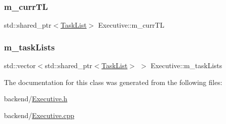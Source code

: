 \subsubsection{\texorpdfstring{m\+\_\+curr\+TL}{m\_currTL}}
{\footnotesize\ttfamily std\+::shared\+\_\+ptr$<$\mbox{\hyperlink{class_task_list}{Task\+List}}$>$ Executive\+::m\+\_\+curr\+TL}

\mbox{\label{class_executive_abaad195f97ce0a4b4be35064f905fc30}} 
\subsubsection{\texorpdfstring{m\+\_\+task\+Lists}{m\_taskLists}}
{\footnotesize\ttfamily std\+::vector$<$std\+::shared\+\_\+ptr$<$\mbox{\hyperlink{class_task_list}{Task\+List}}$>$ $>$ Executive\+::m\+\_\+task\+Lists}



The documentation for this class was generated from the following files\+:\begin{DoxyCompactItemize}
\item 
backend/\mbox{\hyperlink{_executive_8h}{Executive.\+h}}\item 
backend/\mbox{\hyperlink{_executive_8cpp}{Executive.\+cpp}}\end{DoxyCompactItemize}

